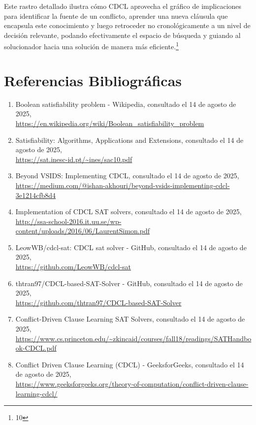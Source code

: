 \documentclass{article}
\begin{document}
Este rastro detallado ilustra cómo CDCL aprovecha el gráfico de implicaciones para identificar la fuente de un conflicto, aprender una nueva cláusula que encapsula este conocimiento y luego retroceder no cronológicamente a un nivel de decisión relevante, podando efectivamente el espacio de búsqueda y guiando al solucionador hacia una solución de manera más eficiente.\footnote{10}

\newpage

\section*{Referencias Bibliográficas}

\begin{enumerate}
\item Boolean satisfiability problem - Wikipedia, consultado el 14 de agosto de 2025, \\ \url{https://en.wikipedia.org/wiki/Boolean_satisfiability_problem}
\item Satisfiability: Algorithms, Applications and Extensions, consultado el 14 de agosto de 2025, \\ \url{https://sat.inesc-id.pt/~ines/sac10.pdf}
\item Beyond VSIDS: Implementing CDCL, consultado el 14 de agosto de 2025, \\ \url{https://medium.com/@ishan-akhouri/beyond-vsids-implementing-cdcl-3e1214cfb8d4}
\item Implementation of CDCL SAT solvers, consultado el 14 de agosto de 2025, \\ \url{http://ssa-school-2016.it.uu.se/wp-content/uploads/2016/06/LaurentSimon.pdf}
\item LeowWB/cdcl-sat: CDCL sat solver - GitHub, consultado el 14 de agosto de 2025, \\ \url{https://github.com/LeowWB/cdcl-sat}
\item thtran97/CDCL-based-SAT-Solver - GitHub, consultado el 14 de agosto de 2025, \\ \url{https://github.com/thtran97/CDCL-based-SAT-Solver}
\item Conflict-Driven Clause Learning SAT Solvers, consultado el 14 de agosto de 2025, \\ \url{https://www.cs.princeton.edu/~zkincaid/courses/fall18/readings/SATHandbook-CDCL.pdf}
\item Conflict Driven Clause Learning (CDCL) - GeeksforGeeks, consultado el 14 de agosto de 2025, \\ \url{https://www.geeksforgeeks.org/theory-of-computation/conflict-driven-clause-learning-cdcl/}

\end{enumerate}
\end{document}
